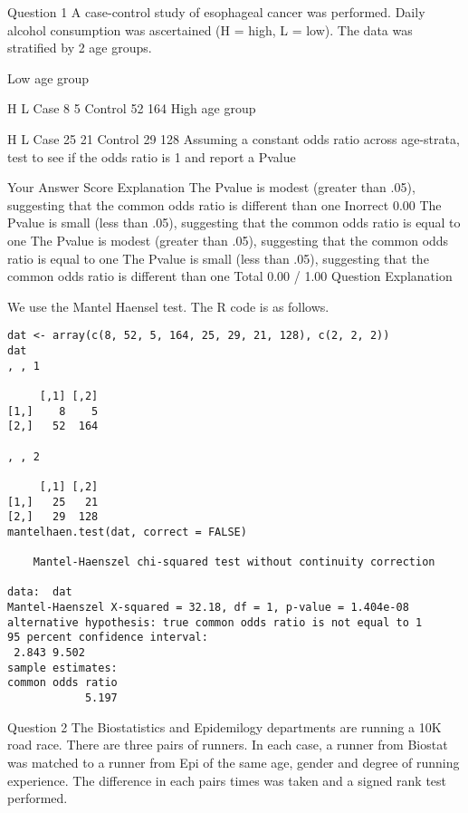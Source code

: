 Question 1
A case-control study of esophageal cancer was performed. Daily alcohol consumption was ascertained (H = high, L = low). The data was stratified by 2 age groups.

Low age group

H	L
Case	8	5
Control	52	164
High age group

H	L
Case	25	21
Control	29	128
Assuming a constant odds ratio across age-strata, test to see if the odds ratio is 1 and report a Pvalue

Your Answer		Score	Explanation
The Pvalue is modest (greater than .05), suggesting that the common odds ratio is different than one	Inorrect	0.00	
The Pvalue is small (less than .05), suggesting that the common odds ratio is equal to one			
The Pvalue is modest (greater than .05), suggesting that the common odds ratio is equal to one			
The Pvalue is small (less than .05), suggesting that the common odds ratio is different than one			
Total		0.00 / 1.00	
Question Explanation

We use the Mantel Haensel test. The R code is as follows.

\begin{framed}
\begin{verbatim}
dat <- array(c(8, 52, 5, 164, 25, 29, 21, 128), c(2, 2, 2))
dat
, , 1

     [,1] [,2]
[1,]    8    5
[2,]   52  164

, , 2

     [,1] [,2]
[1,]   25   21
[2,]   29  128
mantelhaen.test(dat, correct = FALSE)

    Mantel-Haenszel chi-squared test without continuity correction

data:  dat 
Mantel-Haenszel X-squared = 32.18, df = 1, p-value = 1.404e-08
alternative hypothesis: true common odds ratio is not equal to 1 
95 percent confidence interval:
 2.843 9.502 
sample estimates:
common odds ratio 
            5.197 
\end{verbatim}
\end{framed}
Question 2
The Biostatistics and Epidemilogy departments are running a 10K road race. There are three pairs of runners. In each case, a runner from Biostat was matched to a runner from Epi of the same age, gender and degree of running experience. The difference in each pairs times was taken and a signed rank test performed.

